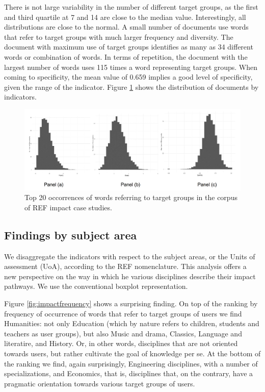 \documentclass[]{book}
\begin{document}
There is not large variability in the number of different target groups,
as the first and third quartile at 7 and 14 are close to the median
value. Interestingly, all distributions are close to the normal. A small
number of documents use words that refer to target groups with much
larger frequency and diversity. The document with maximum use of target
groups identifies as many as 34 different words or combination of words.
In terms of repetition, the document with the largest number of words
uses 115 times a word representing target groups. When coming to
specificity, the mean value of 0.659 implies a good level of
specificity, given the range of the indicator. Figure
\ref{fig:impactusersfreqcomparison} shows the distribution of documents
by indicators.

\begin{figure}

{\centering \includegraphics[width=1\linewidth]{_bookdown_files/figures/impact_users_freq_comparison} 

}

\caption{Top 20 occorrences of words referring to target groups in the corpus of REF impact case studies.}\label{fig:impactusersfreqcomparison}
\end{figure}

\subsection{Findings by subject area}\label{findings-by-subject-area}

We disaggregate the indicators with respect to the subject areas, or the
Units of assessment (UoA), according to the REF nomenclature. This
analysis offers a new perspective on the way in which he various
disciplines describe their impact pathways. We use the conventional
boxplot representation.

Figure \ref{fig:impactfrequency} shows a surprising finding. On top of
the ranking by frequency of occurrence of words that refer to target
groups of users we find Humanities: not only Education (which by nature
refers to children, students and teachers as user groups), but also
Music and drama, Classics, Language and literatire, and History. Or, in
other words, disciplines that are not oriented towards users, but rather
cultivate the goal of knowledge per se. At the bottom of the ranking we
find, again surprisingly, Engineering disciplines, with a number of
specializations, and Economics, that is, disciplines that, on the
contrary, have a pragmatic orientation towards various target groups of
users.
\end{document}
